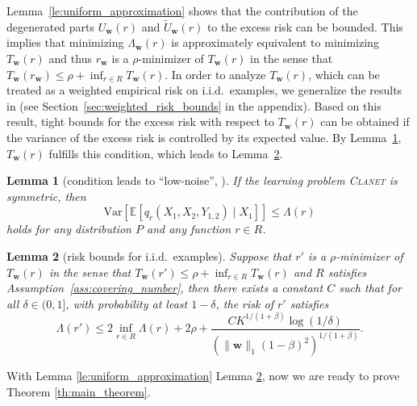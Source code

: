 \documentclass[letterpaper]{article} %
\newtheorem{lemma}{Lemma}
\newcommand{\E}{\mathbb{E}}
\newcommand{\Var}{\text{Var}}
\newcommand{\weight}{\mathbf{w}}
\newcommand{\distribution}{P}
\newcommand{\problemabbr}{\textnormal{C}\textsc{lanet}}
\newcommand{\normo}[1]{\|#1\|_1}
\newcommand{\complexbound}{\beta}
\newcommand{\red}[1]{\textcolor{red}{#1}}
\newcommand{\todo}[1]{\red{\textsc{todo:} #1}}
\begin{document}
Lemma~\ref{le:uniform_approximation} shows that the contribution of the degenerated parts $U_\weight{}(r)$ and $\widetilde{U}_\weight{}(r)$ to the excess risk can be bounded. 
This implies that minimizing $\Lambda_\weight{}(r)$ is approximately equivalent to minimizing $T_\weight{}(r)$ and thus $r_\weight{}$ is a $\rho$-minimizer of $T_\weight{}(r)$ in the sense that $T_\weight{}(r_\weight{})\le \rho+\inf_{r\in R}T_\weight{}(r)$.
In order to analyze $T_\weight{}(r)$, which can be treated as a weighted empirical risk on i.i.d.\ examples, we generalize the results in \cite{Massart2006} (see Section~\ref{sec:weighted_risk_bounds} in the appendix). 
Based on this result, tight bounds for the excess risk with respect to $T_\weight{}(r)$
can be obtained if the variance of the excess risk is controlled by its expected value.
By Lemma~\ref{le:variant_control}, $T_\weight{}(r)$ fulfills this condition, which leads to Lemma~\ref{le:risk_bounds_iid}.

\begin{lemma}[condition leads to ``low-noise'', {\cite[Lemma 2]{papa2016graph}}]
    \label{le:variant_control}
    If the learning problem \problemabbr{} is symmetric, then
    \begin{equation}
        \label{eq:variant_control}
        \Var\left[\E[q_r(X_1,X_2,Y_{1,2})\mid X_1]\right]\le \Lambda(r) 
    \end{equation}
    holds for any distribution $\distribution$ and any function $r\in R$.
\end{lemma}

\begin{lemma}[risk bounds for i.i.d.\ examples]
\label{le:risk_bounds_iid}
  Suppose that $r'$ is a $\rho$-minimizer of $T_\weight{}(r)$ in the sense that $T_\weight{}(r')\le \rho + \inf_{r\in R}T_\weight{}(r)$ and $R$ satisfies Assumption~\ref{ass:covering_number}, then there exists a constant $C$ such that for all $\delta\in(0,1]$, with probability at least $1-\delta$, the risk of $r'$ satisfies
  \[\Lambda(r')\le 2\inf_{r\in R}\Lambda(r)+2\rho+\frac{CK^{1/(1+\complexbound{})}\log(1/\delta)}{(\normo{\weight{}}(1-\complexbound{})^2)^{1/(1+\complexbound{})}}.\]
\end{lemma}


With Lemma \ref{le:uniform_approximation} Lemma \ref{le:risk_bounds_iid}, now we are ready to prove Theorem \ref{th:main_theorem}.
\end{document}
